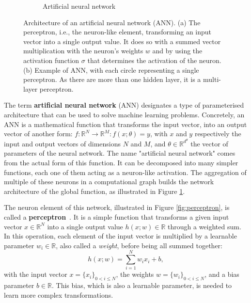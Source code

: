 \begin{figure}[h]
\begin{subfigure}[b]{0.5\textwidth}
        \caption{Artificial neural network}
        \label{fig:mlp}
    \end{subfigure}
    \hfill
    \caption{Architecture of an artificial neural network (ANN). (a) The perceptron, i.e., the neuron-like element, transforming an input vector into a single output value. It does so with a summed vector multiplication with the neuron's weights $w$ and by using the activation function $\sigma$ that determines the activation of the neuron. (b) Example of ANN, with each circle representing a single perceptron. As there are more than one hidden layer, it is a multi-layer perceptron.}
    \label{fig:ann}
\end{figure}

The term \textbf{artificial neural network} (ANN) designates a type of parameterised architecture that can be used to solve machine learning problems. Concretely, an ANN is a mathematical function that transforms the input vector, into an output vector of another form: $f:\mathbb{R}^N\rightarrow\mathbb{R}^M:f(x;\theta)=y$, with $x$ and $y$ respectively the input and output vectors of dimensions $N$ and $M$, and $\theta\in\mathbb{R}^{d^\theta}$ the vector of parameters of the neural network. The name "artificial neural network" comes from the actual form of this function. It can be decomposed into many simpler functions, each one of them acting as a neuron-like activation. The aggregation of multiple of these neurons in a computational graph builds the network architecture of the global function, as illustrated in Figure \ref{fig:mlp}.

The neuron element of this network, illustrated in Figure \ref{fig:perceptron}, is called a \textbf{perceptron}~\citep{Rosenblatt1958_Perceptron}. It is a simple function that transforms a given input vector $x\in\mathbb{R}^N$ into a single output value $h(x;w)\in\mathbb{R}$ through a weighted sum. In this operation, each element of the input vector is multiplied by a learnable parameter $w_i\in\mathbb{R}$, also called a \textit{weight}, before being all summed together:
\begin{equation}
    h(x;w)=\sum_{i=1}^Nw_ix_i+b,
\end{equation}
with the input vector $x=\{x_i\}_{0<i\leq N}$, the weights $w=\{w_i\}_{0<i\leq N}$, and a bias parameter $b\in\mathbb{R}$. This bias, which is also a learnable parameter, is needed to learn more complex transformations. 

